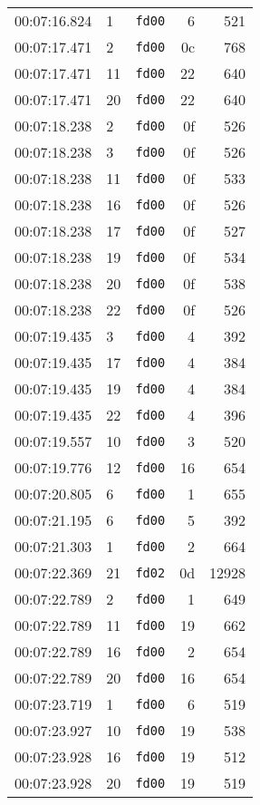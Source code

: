 \documentclass{article}
\begin{document}
\begin{longtable}{lllrr}
00:07:16.824 & 1 & \texttt{fd00} & 6 & 521 \\
00:07:17.471 & 2 & \texttt{fd00} & 0c & 768 \\
00:07:17.471 & 11 & \texttt{fd00} & 22 & 640 \\
00:07:17.471 & 20 & \texttt{fd00} & 22 & 640 \\
00:07:18.238 & 2 & \texttt{fd00} & 0f & 526 \\
00:07:18.238 & 3 & \texttt{fd00} & 0f & 526 \\
00:07:18.238 & 11 & \texttt{fd00} & 0f & 533 \\
00:07:18.238 & 16 & \texttt{fd00} & 0f & 526 \\
00:07:18.238 & 17 & \texttt{fd00} & 0f & 527 \\
00:07:18.238 & 19 & \texttt{fd00} & 0f & 534 \\
00:07:18.238 & 20 & \texttt{fd00} & 0f & 538 \\
00:07:18.238 & 22 & \texttt{fd00} & 0f & 526 \\
00:07:19.435 & 3 & \texttt{fd00} & 4 & 392 \\
00:07:19.435 & 17 & \texttt{fd00} & 4 & 384 \\
00:07:19.435 & 19 & \texttt{fd00} & 4 & 384 \\
00:07:19.435 & 22 & \texttt{fd00} & 4 & 396 \\
00:07:19.557 & 10 & \texttt{fd00} & 3 & 520 \\
00:07:19.776 & 12 & \texttt{fd00} & 16 & 654 \\
00:07:20.805 & 6 & \texttt{fd00} & 1 & 655 \\
00:07:21.195 & 6 & \texttt{fd00} & 5 & 392 \\
00:07:21.303 & 1 & \texttt{fd00} & 2 & 664 \\
00:07:22.369 & 21 & \texttt{fd02} & 0d & 12928 \\
00:07:22.789 & 2 & \texttt{fd00} & 1 & 649 \\
00:07:22.789 & 11 & \texttt{fd00} & 19 & 662 \\
00:07:22.789 & 16 & \texttt{fd00} & 2 & 654 \\
00:07:22.789 & 20 & \texttt{fd00} & 16 & 654 \\
00:07:23.719 & 1 & \texttt{fd00} & 6 & 519 \\
00:07:23.927 & 10 & \texttt{fd00} & 19 & 538 \\
00:07:23.928 & 16 & \texttt{fd00} & 19 & 512 \\
00:07:23.928 & 20 & \texttt{fd00} & 19 & 519 \\

\end{longtable}
\end{document}
